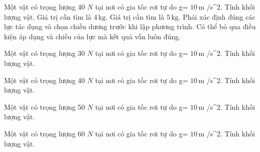 \begin{ex}
Một vật có trọng lượng 40 $N$ tại nơi có gia tốc rơi tự do g= $10\,\text{m}$ /s^2. Tính khối lượng vật.
\choiceTF
{\True Giá trị cần tìm là $4\,\text{kg}$.}
{Giá trị cần tìm là $5\,\text{kg}$.}
{\True Phải xác định đúng các lực tác dụng và chọn chiều dương trước khi lập phương trình.}
{Có thể bỏ qua điều kiện áp dụng và chiều của lực mà kết quả vẫn luôn đúng.}
\end{ex}

\begin{ex}
Một vật có trọng lượng 30 $N$ tại nơi có gia tốc rơi tự do g= $10\,\text{m}$ /s^2. Tính khối lượng vật.
\end{ex}

\begin{ex}
Một vật có trọng lượng 40 $N$ tại nơi có gia tốc rơi tự do g= $10\,\text{m}$ /s^2. Tính khối lượng vật.
\end{ex}

\begin{ex}
Một vật có trọng lượng 50 $N$ tại nơi có gia tốc rơi tự do g= $10\,\text{m}$ /s^2. Tính khối lượng vật.
\end{ex}

\begin{ex}
Một vật có trọng lượng 60 $N$ tại nơi có gia tốc rơi tự do g= $10\,\text{m}$ /s^2. Tính khối lượng vật.
\end{ex}

